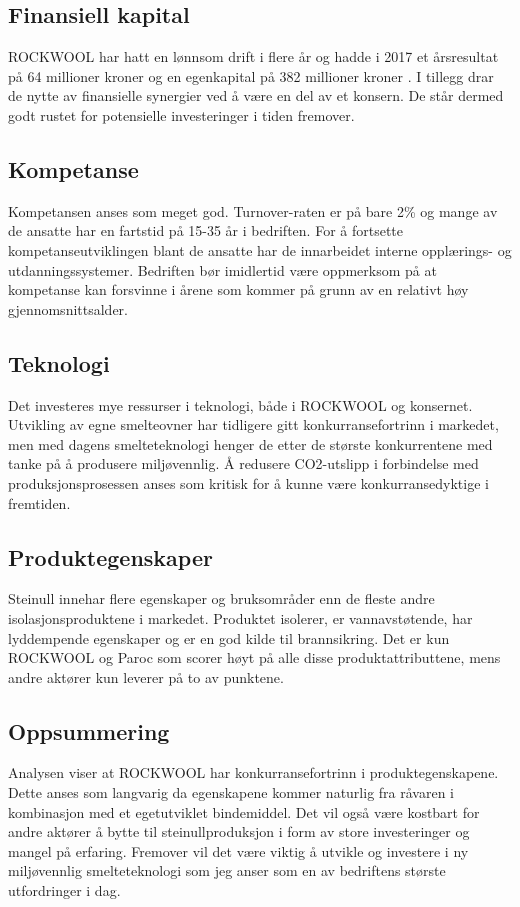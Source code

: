 \subsection{Finansiell kapital}
ROCKWOOL har hatt en lønnsom drift i flere år og hadde i 2017 et årsresultat på 64 millioner kroner og en egenkapital på 382 millioner kroner \cite{ProffRegnskap}. I tillegg drar de nytte av finansielle synergier ved å være en del av et konsern. De står dermed godt rustet for potensielle investeringer i tiden fremover.

\subsection{Kompetanse}
Kompetansen anses som meget god. Turnover-raten er på bare 2\% og mange av de ansatte har en fartstid på 15-35 år i bedriften. For å fortsette kompetanseutviklingen blant de ansatte har de innarbeidet interne opplærings- og utdanningssystemer. Bedriften bør imidlertid være oppmerksom på at kompetanse kan forsvinne i årene som kommer på grunn av en relativt høy gjennomsnittsalder.

\subsection{Teknologi}
Det investeres mye ressurser i teknologi, både i ROCKWOOL og konsernet. Utvikling av egne smelteovner har tidligere gitt konkurransefortrinn i markedet, men med dagens smelteteknologi henger de etter de største konkurrentene med tanke på å produsere miljøvennlig. Å redusere CO2-utslipp i forbindelse med produksjonsprosessen anses som kritisk for å kunne være konkurransedyktige i fremtiden.

\subsection{Produktegenskaper}
Steinull innehar flere egenskaper og bruksområder enn de fleste andre isolasjonsproduktene i markedet. Produktet isolerer, er vannavstøtende, har lyddempende egenskaper og er en god kilde til brannsikring. Det er kun ROCKWOOL og Paroc som scorer høyt på alle disse produktattributtene, mens andre aktører kun leverer på to av punktene.

\subsection{Oppsummering}
Analysen viser at ROCKWOOL har konkurransefortrinn i produktegenskapene. Dette anses som langvarig da egenskapene kommer naturlig fra råvaren i kombinasjon med et egetutviklet bindemiddel. Det vil også være kostbart for andre aktører å bytte til steinullproduksjon i form av store investeringer og mangel på erfaring. Fremover vil det være viktig å utvikle og investere i ny miljøvennlig smelteteknologi som jeg anser som en av bedriftens største utfordringer i dag.